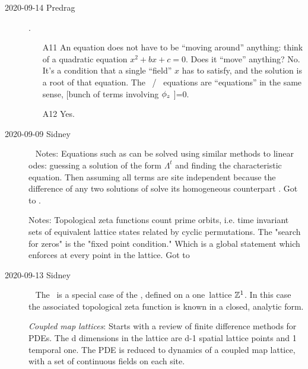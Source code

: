 \begin{description}
\item[2020-09-14 Predrag].
\begin{itemize}
	\item[A11]
An equation does not have to be ``moving around'' anything: think of a
quadratic equation $x^2+bx+c=0$. Does it ``move'' anything? No. It's a condition
that a single ``field'' $x$ has to satisfy, and the solution is a root of that
equation.
The \templatt\ / \catlatt\ equations are ``equations'' in the same sense,
[bunch of terms involving $\phi_z$ ]=0.
	\item[A12]
Yes.
\end{itemize}

\item[2020-09-09 Sidney]~
Notes: Equations such as  can be solved using similar methods to linear odes: guessing a solution of the form $\Lambda^t$ and finding the characteristic equation. Then assuming all terms are site independent because the difference of any two solutions of  solve its homogeneous counterpart . Got to .

Notes: Topological zeta functions count prime orbits, i.e. time invariant sets of equivalent lattice states related by cyclic permutations. The "search for zeros"  is the "fixed point condition." Which is a global statement which enforces  at every point in the lattice. Got to 

\item[2020-09-13 Sidney]~
The \templatt\ is a special case of the \catlatt, defined on a one\dmn\
lattice $\mathbb{Z}^1$. In this case the associated topological zeta
function is known in a closed, analytic form.

\emph{Coupled map lattices}: Starts with a review of finite difference
methods for PDEs. The d dimensions in the lattice are d-1 spatial lattice
points and 1 temporal one. The PDE is reduced to dynamics of a coupled
map lattice, with a set of continuous fields on each site.


\end{description}
